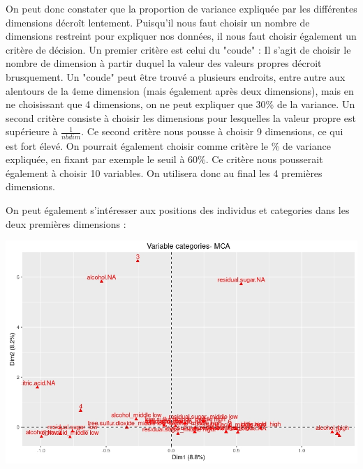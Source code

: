 \documentclass[11pt,a4paper]{article}
\begin{document}
On peut donc constater que la proportion de variance expliquée par les différentes dimensions décroît lentement. Puisqu'il nous faut choisir un nombre de dimensions restreint pour expliquer nos données, il nous faut choisir également un critère de décision. Un premier critère est celui du "coude" : Il s'agit de choisir le nombre de dimension à partir duquel la valeur des valeurs propres décroit brusquement. Un "coude" peut être trouvé a plusieurs endroits, entre autre aux alentours de la 4eme dimension (mais également après deux dimensions), mais en ne choisissant que 4 dimensions, on ne peut expliquer que 30\% de la variance. Un second critère consiste à choisir les dimensions pour lesquelles la valeur propre est supérieure à $\frac{1}{nbdim}$. Ce second critère nous pousse à choisir 9 dimensions, ce qui est fort élevé. On pourrait également choisir comme critère le \% de variance expliquée, en fixant par exemple le seuil à 60\%. Ce critère nous pousserait également à choisir 10 variables. On utilisera  donc au final les 4 premières dimensions.\bigskip

On peut également s'intéresser aux positions des individus et categories dans les deux premières dimensions :

\begin{center}
\includegraphics[scale=0.6]{"biplot-mca"}
\end{center}
\end{document}
